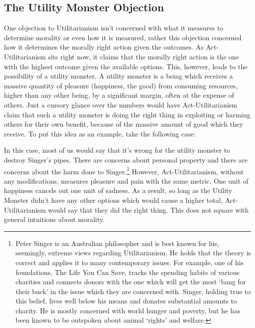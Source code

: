 \subsection{The Utility Monster Objection}

One objection to Utilitarianism isn't concerned with what it measures to determine morality or even how it is measured, rather this objection concerned how it determines the morally right action given the outcomes. As Act-Utilitarianism sits right now, it claims that the morally right action is the one with the highest outcome given the available options. This, however, leads to the possibility of a utility monster. A utility monster is a being which receives a massive quantity of pleasure (happiness, the good) from consuming resources, higher than any other being, by a significant margin, often at the expense of others. Just a cursory glance over the numbers would have Act-Utilitarianism claim that such a utility monster is doing the right thing in exploiting or harming others for their own benefit, because of the massive amount of good which they receive. To put this idea as an example, take the following case:


In this case, most of us would say that it's wrong for the utility monster to destroy Singer's pipes. There are concerns about personal property and there are concerns about the harm done to Singer.\footnote{Peter Singer is an Australian philosopher and is best known for his, seemingly, extreme views regarding Utilitarianism. He holds that the theory is correct and applies it to many contemporary issues. For example, one of his foundations, The Life You Can Save, tracks the spending habits of various charities and connects donors with the one which will get the most `bang for their buck' in the issue which they are concerned with. Singer, holding true to this belief, lives well below his means and donates substantial amounts to charity. He is mostly concerned with world hunger and poverty, but he has been known to be outspoken about animal `rights' and welfare. } However, Act-Utilitarianism, without any modifications, measures pleasure and pain with the same metric. One unit of happiness cancels out one unit of sadness. As a result, so long as the Utility Monster didn't have any other options which would cause a higher total, Act-Utilitarianism would say that they did the right thing. This does not square with general intuitions about morality. 

